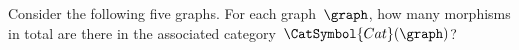 \ifextraspace{\vfill\pagebreak}


\begin{widepar}
    \begin{gradedexercise}
        \label{ex:HowManyMorphisms}
        Consider the following five graphs.
        For each graph~$\graph$, how many morphisms in total are there in the associated category~$\CatSymbol{Cat}(\graph)$?
    \end{gradedexercise}
\end{widepar}
